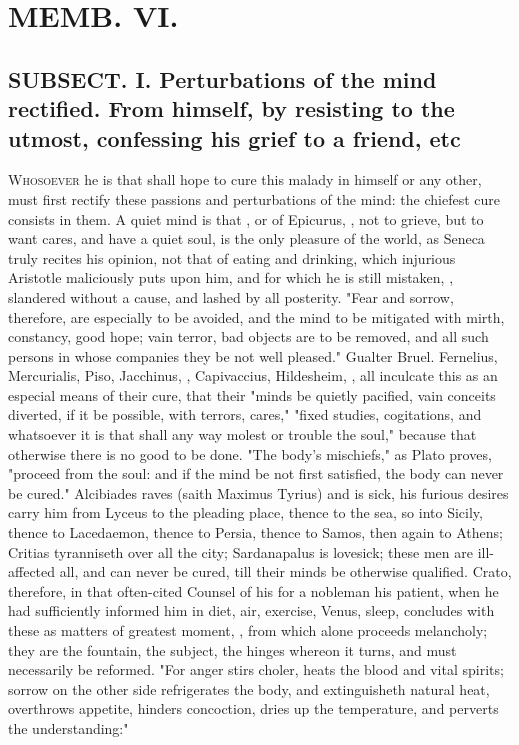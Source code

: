 {\chapter{MEMB. VI.}


\section[SUBSECTION I Perturbations of the mind rectified.]{SUBSECT. I. Perturbations of the mind rectified. From himself, by resisting to the utmost, confessing his grief to a friend, etc}


\lettrine{W}{hosoever} he is that shall hope to cure this malady in himself or any other, must first rectify these passions and perturbations of the mind: the chiefest cure consists in them. A quiet mind is that , or  of Epicurus, , not to grieve, but to want cares, and have a quiet soul, is the only pleasure of the world, as Seneca truly recites his opinion, not that of eating and drinking, which injurious Aristotle maliciously puts upon him, and for which he is still mistaken, , slandered without a cause, and lashed by all posterity. "Fear and sorrow, therefore, are especially to be avoided, and the mind to be mitigated with mirth, constancy, good hope; vain terror, bad objects are to be removed, and all such persons in whose companies they be not well pleased." Gualter Bruel. Fernelius,  Mercurialis,  Piso, Jacchinus, , Capivaccius, Hildesheim, \etc{}, all inculcate this as an especial means of their cure, that their "minds be quietly pacified, vain conceits diverted, if it be possible, with terrors, cares," "fixed studies, cogitations, and whatsoever it is that shall any way molest or trouble the soul," because that otherwise there is no good to be done. "The body's mischiefs," as Plato proves, "proceed from the soul: and if the mind be not first satisfied, the body can never be cured." Alcibiades raves (saith Maximus Tyrius) and is sick, his furious desires carry him from Lyceus to the pleading place, thence to the sea, so into Sicily, thence to Lacedaemon, thence to Persia, thence to Samos, then again to Athens; Critias tyranniseth over all the city; Sardanapalus is lovesick; these men are ill-affected all, and can never be cured, till their minds be otherwise qualified. Crato, therefore, in that often-cited Counsel of his for a nobleman his patient, when he had sufficiently informed him in diet, air, exercise, Venus, sleep, concludes with these as matters of greatest moment, , from which alone proceeds melancholy; they are the fountain, the subject, the hinges whereon it turns, and must necessarily be reformed. "For anger stirs choler, heats the blood and vital spirits; sorrow on the other side refrigerates the body, and extinguisheth natural heat, overthrows appetite, hinders concoction, dries up the temperature, and perverts the understanding:" }
